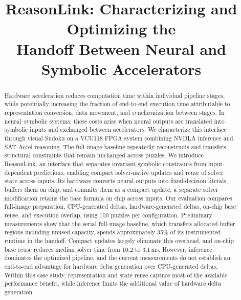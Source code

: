 \documentclass[conference,10pt,letterpaper]{IEEEtran}
\title{ReasonLink: Characterizing and Optimizing the\\Handoff Between Neural and Symbolic Accelerators}
\author{\IEEEauthorblockN{Vayun Gupta (vg2684), Aaron Mano Cherian (amc2535)}
\IEEEauthorblockA{Columbia University}}
\begin{document}
\maketitle
\thispagestyle{plain}
\pagestyle{plain}

\begin{abstract}
Hardware acceleration reduces computation time within individual pipeline stages, while potentially increasing the fraction of end-to-end execution time attributable to representation conversion, data movement, and synchronization between stages. In neural--symbolic systems, these costs arise when neural outputs are translated into symbolic inputs and exchanged between accelerators. We characterize this interface through visual Sudoku on a VCU118 FPGA system combining NVDLA inference and SAT-Accel reasoning. The full-image baseline repeatedly reconstructs and transfers structural constraints that remain unchanged across puzzles. We introduce ReasonLink, an interface that separates invariant symbolic constraints from input-dependent predictions, enabling compact solver-native updates and reuse of solver state across inputs. Its hardware converts neural outputs into fixed-decision literals, buffers them on chip, and commits them as a compact update; a separate solver modification retains the base formula on chip across inputs. Our evaluation compares full-image preparation, CPU-generated deltas, hardware-generated deltas, on-chip base reuse, and execution overlap, using 100 puzzles per configuration. Preliminary measurements show that the serial full-image baseline, which transfers allocated buffer regions including unused capacity, spends approximately 35\% of its instrumented runtime in the handoff. Compact updates largely eliminate this overhead, and on-chip base reuse reduces median solver time from 10.2 to 3.1\,ms. However, inference dominates the optimized pipeline, and the current measurements do not establish an end-to-end advantage for hardware delta generation over CPU-generated deltas. Within this case study, representation and state reuse capture most of the available performance benefit, while inference limits the additional value of hardware delta generation.
\end{abstract}







\end{document}
